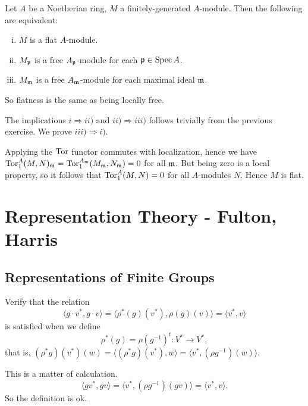 \documentclass[11pt, english]{article}
\begin{document}
\begin{exc}[Exercise 16]
 Let $A$ be a Noetherian ring, $M$ a finitely-generated $A$-module. Then the following are equivalent:
 \begin{enumerate}[i)]
 \item $M$ is a flat $A$-module.
\item $M_{\mathfrak{p}}$ is a free $A_{\mathfrak{p}}$-module for each $\mathfrak{p} \in \operatorname{Spec} A$.
\item $M_{\mathfrak{m}}$ is a free $A_{\mathfrak{m}}$-module for each maximal ideal $\mathfrak{m}$.
 \end{enumerate}

So flatness is the same as being locally free.
\end{exc}
\begin{sol}
 The implications $i \Rightarrow ii)$ and $ii) \Rightarrow iii)$ follows trivially from the previous exercise. We prove $iii) \Rightarrow i)$. 

Applying the $\operatorname{\mathrm{Tor}}$ functor commutes with localization, hence we have $\operatorname{\mathrm{Tor}}_1^A(M,N)_{\mathfrak{m}} = \operatorname{\mathrm{Tor}}_1^{A_{\mathfrak{m}}}(M_{\mathfrak{m}}, N_{\mathfrak{m}})=0$ for all $\mathfrak{m}$. But being zero is a local property, so it follows that $\operatorname{\mathrm{Tor}}_1^A(M,N)=0$ for all $A$-modules $N$. Hence $M$ is flat.
\end{sol}


\section{Representation Theory - Fulton, Harris}

\subsection{Representations of Finite Groups}

\begin{exc}[Exercise 1.1]
Verify that the relation 
\[
\langle g\cdot v^\ast , g \cdot v \rangle = \langle \rho^\ast(g)(v^\ast),\rho(g)(v) \rangle = \langle v^\ast, v\rangle 
\]
is satisfied when we define
\[
\rho^\ast(g) = \rho(g^{-1})^t :V^\ast \to V^\ast, 
\]
that is, $(\rho^\ast g)(v^\ast)(w)= \langle (\rho^\ast g)(v^\ast),w\rangle=\langle v^\ast, (\rho g^{-1})(w) \rangle$.
\end{exc}

\begin{sol}
This is a matter of calculation.
\[
\langle g v^\ast, gv \rangle = \langle v^\ast, (\rho g^{-1})(gv) \rangle = \langle v^\ast, v \rangle.
\]
So the definition is ok.
\end{sol}
\end{document}
